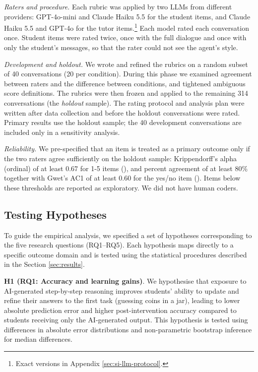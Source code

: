 \documentclass[
  12pt,
]{article}
\begin{document}
\emph{Raters and procedure.} Each rubric was applied by two LLMs from different providers: GPT-4o-mini and Claude Haiku 5.5 for the student items, and Claude Haiku 5.5 and GPT-4o for the tutor items.\footnote{Exact versions in Appendix \ref{sec:si-llm-protocol}.} Each model rated each conversation once. Student items were rated twice, once with the full dialogue and once with only the student's messages, so that the rater could not see the agent's style.

\emph{Development and holdout.} We wrote and refined the rubrics on a random subset of 40 conversations (20 per condition). During this phase we examined agreement between raters and the difference between conditions, and tightened ambiguous score definitions. The rubrics were then frozen and applied to the remaining 314 conversations (the \emph{holdout} sample). The rating protocol and analysis plan were written after data collection and before the holdout conversations were rated. Primary results use the holdout sample; the 40 development conversations are included only in a sensitivity analysis.

\emph{Reliability.} We pre-specified that an item is treated as a primary outcome only if the two raters agree sufficiently on the holdout sample: Krippendorff's alpha (ordinal) of at least 0.67 for 1-5 items (), and percent agreement of at least 80\% together with Gwet's AC1 of at least 0.60 for the yes/no item (). Items below these thresholds are reported as exploratory.
We did not have human coders.

\subsection{Testing Hypotheses}\label{testing-hypotheses}

To guide the empirical analysis, we specified a set of hypotheses corresponding to the five research questions (RQ1--RQ5). Each hypothesis maps directly to a specific outcome domain and is tested using the statistical procedures described in the Section \ref{sec:results}.

\textbf{H1 (RQ1: Accuracy and learning gains)}.
We hypothesise that exposure to AI-generated step-by-step reasoning improves students' ability to update and refine their answers to the first task (guessing coins in a jar), leading to lower absolute prediction error and higher post-intervention accuracy compared to students receiving only the AI-generated output. This hypothesis is tested using differences in absolute error distributions and non-parametric bootstrap inference for median differences.
\end{document}
